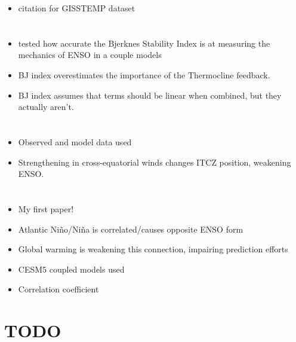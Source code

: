 \documentclass[11pt]{article}
\begin{document}
\begin{itemize}
\item citation for GISSTEMP dataset
\end{itemize}

\section{\cite{graham2014effectiveness}}
\label{sec:orga71922b}

\begin{itemize}
\item tested how accurate the Bjerknes Stability Index is at measuring the mechanics of ENSO in a couple models
\item BJ index overestimates the importance of the Thermocline feedback.
\item BJ index assumes that terms should be linear when combined, but they actually aren't.
\end{itemize}

\section{\cite{hu2018cross}}
\label{sec:org025902a}

\begin{itemize}
\item Observed and model data used
\item Strengthening in cross-equatorial winds changes ITCZ position, weakening ENSO.
\end{itemize}

\section{\cite{jia2019weakening}}
\label{sec:org43889c8}

\begin{itemize}
\item My first paper!
\item Atlantic Niño/Niña is correlated/causes opposite ENSO form
\item Global warming is weakening this connection, impairing prediction efforts
\item CESM5 coupled models used
\item Correlation coefficient
\end{itemize}

\section{{\bfseries\sffamily TODO} \cite{jimenez2016record}}
\label{sec:org518f64c}
\end{document}
